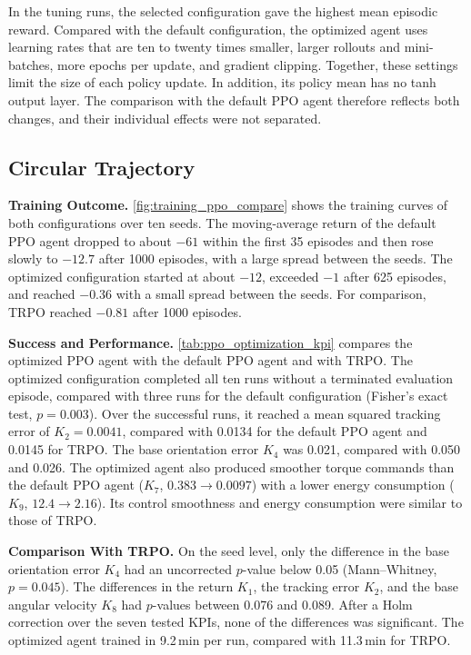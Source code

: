 \documentclass{ieeeaccess}
\begin{document}
In the tuning runs, the selected configuration gave the highest mean episodic reward. Compared with the
default configuration, the optimized agent uses learning rates that are ten to twenty times smaller,
larger rollouts and mini-batches, more epochs per update, and gradient clipping. Together, these settings
limit the size of each policy update. In addition, its policy mean has no tanh output layer. The
comparison with the default PPO agent therefore reflects both changes, and their individual effects
were not separated.

\subsection{Circular Trajectory}

\textbf{Training Outcome.} \cref{fig:training_ppo_compare} shows the training curves of both
configurations over ten seeds. The moving-average return of the default PPO agent dropped to about $-61$
within the first 35 episodes and then rose slowly to $-12.7$ after 1000 episodes, with a large spread
between the seeds. The optimized configuration started at about $-12$, exceeded $-1$ after 625 episodes,
and reached $-0.36$ with a small spread between the seeds. For comparison, TRPO reached $-0.81$ after 1000
episodes.

\textbf{Success and Performance.} \cref{tab:ppo_optimization_kpi} compares the optimized PPO agent with the
default PPO agent and with TRPO. The optimized configuration completed all ten runs without a terminated
evaluation episode, compared with three runs for the default configuration (Fisher's exact test,
$p = 0.003$). Over the successful runs, it reached a mean squared tracking error of $K_2 = 0.0041$,
compared with 0.0134 for the default PPO agent and 0.0145 for TRPO. The base orientation error $K_4$ was
0.021, compared with 0.050 and 0.026. The optimized agent also produced smoother torque commands than the
default PPO agent ($K_7$, $0.383 \to 0.0097$) with a lower energy consumption ($K_9$, $12.4 \to 2.16$).
Its control smoothness and energy consumption were similar to those of TRPO.

\textbf{Comparison With TRPO.} On the seed level, only the difference in the base orientation error
$K_4$ had an uncorrected $p$-value below 0.05 (Mann--Whitney, $p = 0.045$). The differences in the
return $K_1$, the tracking error $K_2$, and the base angular velocity $K_8$ had $p$-values between 0.076
and 0.089. After a Holm correction over the seven tested KPIs, none of the differences was significant.
The optimized agent trained in 9.2\,min per run, compared with 11.3\,min for TRPO.
\end{document}
